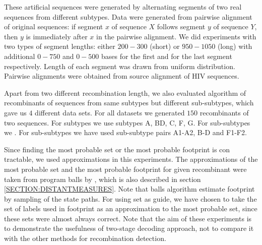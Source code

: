 These artificial sequences were generated by alternating segments of two real
sequences from different subtypes. Data were generated from pairwise alignment
of original sequences: if segment $x$ of sequence $X$ follows segment $y$ of
sequence $Y$, then $y$ is immediately after $x$ in the pairwise alignment. We
did experiments with two types of segment lengths: either $200-300$ (short) or
$950-1050$ (long) with additional $0-750$ and $0-500$ bases for the first and
for the last segment respectively. Length of each segment was drawn from uniform
distribution.  Pairwise alignments were obtained from source alignment of HIV
sequences.

Apart from two different recombination length, we also evaluated algorithm of
recombinants of sequences from same subtypes but different sub-subtypes, which
gave us $4$ different data sets. For all datasets we generated $150$
recombinants of two sequences. For subtypes we use subtypes A, BD, C, F, G. For
sub-subtypes we . For sub-subtypes we have used sub-subtype pairs A1-A2, B-D and
F1-F2.

Since finding the most probable set or the most probable footprint is con
tractable, we used approximations in this experiments. The approximations of the
most probable set and the most probable footprint for given recombinant were
taken from program balls by \cite{Brown2010}, which is also described in section
\ref{SECTION:DISTANTMEASURES}. Note that balls algorithm estimate footprint by
sampling of the state paths. For using set as guide, we have chosen to take the
set of labels used in footprint as an approximation to the most probable set,
since these sets were almost always correct. Note that the aim of these
experiments is to demonstrate the usefulness of two-stage decoding approach, not
to compare it with the other methods for recombination detection.

